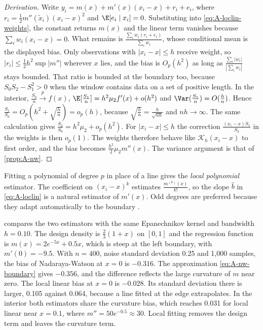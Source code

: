 \begin{proof}[Derivation]
Write $y_i=m(x)+m'(x)(x_i-x)+r_i+e_i$, where $r_i=\frac{1}{2}m''(\tilde x_i)(x_i-x)^2$ and
$\E[e_i\mid x_i]=0$. Substituting into \eqref{eq:A-loclin-weights}, the constant returns $m(x)$ and the
linear term vanishes because $\sum_iw_i(x_i-x)=0$. What remains is
$\frac{\sum_iw_i(r_i+e_i)}{\sum_iw_i}$, whose conditional mean is the displayed bias. Only observations
with $|x_i-x|\le h$ receive weight, so $|r_i|\le\frac{1}{2}h^2\sup|m''|$ wherever $x$ lies, and the bias
is $O_p(h^2)$ as long as $\frac{\sum_i|w_i|}{|\sum_iw_i|}$ stays bounded. That ratio is bounded at the
boundary too, because $S_0S_2-S_1^2>0$ when the window contains data on a set of positive length. In the
interior, $\frac{S_0}{n}\xrightarrow{p}f(x)$, $\E[\frac{S_1}{n}]=h^2\mu_2f'(x)+o(h^2)$ and $\Var(\frac{S_1}{n})=O(\frac{h}{n})$.
Hence $\frac{S_1}{S_0}=O_p(h^2+\sqrt{\frac{h}{n}})=o_p(h)$, because $\sqrt{\frac{h}{n}}=\frac{h}{\sqrt{nh}}$ and
$nh\to\infty$. The same calculation gives $\frac{S_2}{S_0}=h^2\mu_2+o_p(h^2)$. For $|x_i-x|\le h$ the
correction $\frac{(x_i-x)S_1}{S_2}$ in the weights is then $o_p(1)$. The weights therefore behave like
$\mathcal{K}_h(x_i-x)$ to first order, and the bias becomes $\frac{h^2}{2}\mu_2m''(x)$. The variance
argument is that of \cref{prop:A-nw}.
\end{proof}

Fitting a polynomial of degree $p$ in place of a line gives the \emph{local polynomial} estimator. The
coefficient on $(x_i-x)^k$ estimates $\frac{m^{(k)}(x)}{k!}$, so the slope $\hat b$ in
\eqref{eq:A-loclin} is a natural estimator of $m'(x)$. Odd degrees are preferred because they adapt
automatically to the boundary \citep{FanGijbels1996}.

 compares the two estimators with the same Epanechnikov kernel and bandwidth $h=0.10$.
The design density is $\frac{2}{3}(1+x)$ on $[0,1]$ and the regression function is $m(x)=2e^{-5x}+0.5x$,
which is steep at the left boundary, with $m'(0)=-9.5$. With $n=400$, noise standard deviation 0.25 and
1,000 samples, the bias of Nadaraya-Watson at $x=0$ is $-0.316$. The approximation
\eqref{eq:A-nw-boundary} gives $-0.356$, and the difference reflects the large curvature of $m$ near
zero. The local linear bias at $x=0$ is $-0.028$. Its standard deviation there is larger, 0.105 against
0.064, because a line fitted at the edge extrapolates. In the interior both estimators share the
curvature bias, which reaches 0.031 for local linear near $x=0.1$, where $m''=50e^{-0.5}\approx30$.
Local fitting removes the design term and leaves the curvature term.

